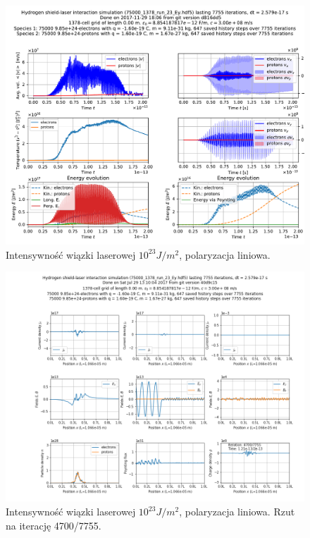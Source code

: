 \begin{figure}[h!]
  \includegraphics[width=\textwidth]{Images/75000_1378_run_23_Ey}
  \caption{Intensywność wiązki laserowej $10^{23} J/m^2$, polaryzacja liniowa.\label{fig:laser-23-Ey}}
\end{figure}

\begin{figure}[h!]
  \includegraphics[width=\textwidth]{Images/75000_1378_run_23_Ey_004700}
  \caption{Intensywność wiązki laserowej $10^{23} J/m^2$, polaryzacja liniowa. Rzut na iterację 4700/7755.\label{fig:laser-23-Ey-snapshot}}
\end{figure}


